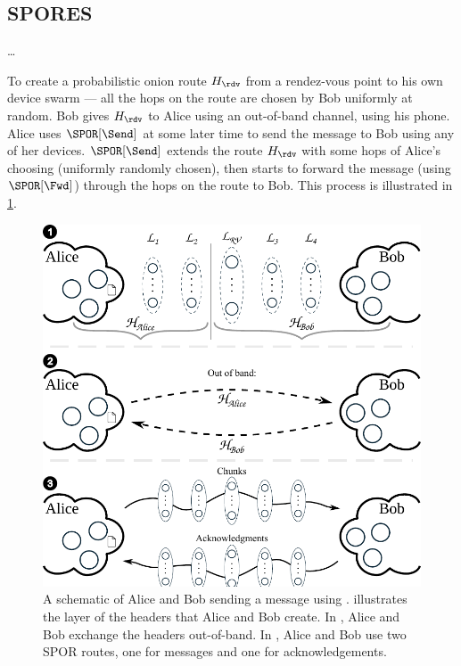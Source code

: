 \subsection{\Acf*{SPORES}}

\dots

To create a probabilistic onion route \(H_\rdv\) from a rendez-vous point to 
his own device swarm --- all the hops on the route are chosen by Bob uniformly 
at random.
Bob gives \(H_\rdv\) to Alice using an out-of-band channel, \eg using his phone.
Alice uses \(\SPOR[\Send]\) at some later time to send the message to Bob using 
any of her devices.
\(\SPOR[\Send]\) extends the route \(H_\rdv\) with some hops of Alice's 
choosing (uniformly randomly chosen), then starts to forward the message (using 
\(\SPOR[\Fwd]\)) through the hops on the route to Bob.
This process is illustrated in \cref{fig:file-exchange}.

\begin{figure}
  \includegraphics[width=\linewidth]{figures/file_exchange_v2.pdf}
  \caption{\label{fig:file-exchange}%
    A schematic of Alice and Bob sending a message using \name.
     illustrates the layer of the headers that Alice and Bob create.
    In , Alice and Bob exchange the headers out-of-band.
    In , Alice and Bob use two \ac{SPOR} routes, one for messages and 
    one for acknowledgements.
  }
\end{figure}

